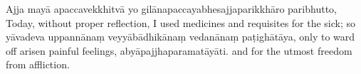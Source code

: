 \begin{chantsubsection}
\chantgap

  \chantlineinline
    {Ajja mayā apaccavekkhitvā yo gilānapaccayabhesajjaparikkhāro paribhutto,}
    {Today, without proper reflection, I used medicines and requisites for the sick;}
  \chantlineinline
    {so yāvadeva uppannānaṃ veyyābādhikānaṃ vedanānaṃ paṭighātāya,}
    {only to ward off arisen painful feelings,}
  \chantlineinline
    {abyāpajjhaparamatāyāti.}
    {and for the utmost freedom from affliction.}
\end{chantsubsection}
